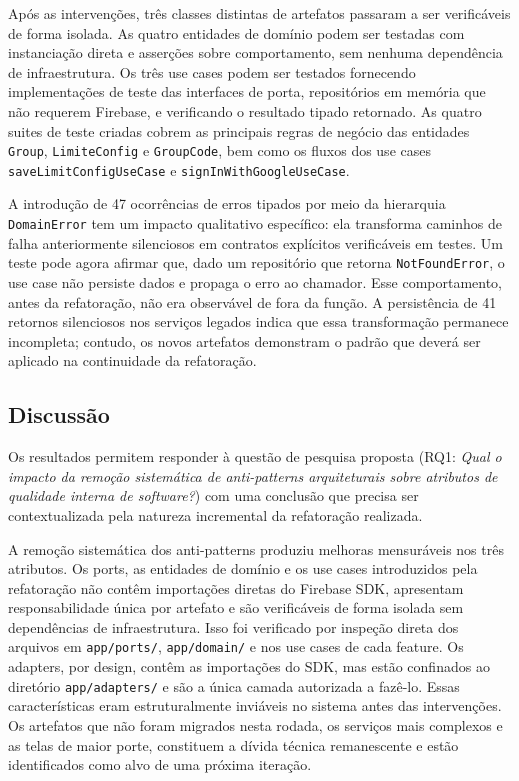 \documentclass[sigconf,anonymous]{acmart}
\begin{document}
Após as intervenções, três classes distintas de artefatos passaram a ser verificáveis de forma isolada. As quatro entidades de domínio podem ser testadas com instanciação direta e asserções sobre comportamento, sem nenhuma dependência de infraestrutura. Os três use cases podem ser testados fornecendo implementações de teste das interfaces de porta, repositórios em memória que não requerem Firebase, e verificando o resultado tipado retornado. As quatro suites de teste criadas cobrem as principais regras de negócio das entidades \texttt{Group}, \texttt{LimiteConfig} e \texttt{GroupCode}, bem como os fluxos dos use cases \texttt{saveLimitConfigUseCase} e \texttt{signInWithGoogleUseCase}.

A introdução de 47 ocorrências de erros tipados por meio da hierarquia \texttt{DomainError} tem um impacto qualitativo específico: ela transforma caminhos de falha anteriormente silenciosos em contratos explícitos verificáveis em testes. Um teste pode agora afirmar que, dado um repositório que retorna \texttt{NotFoundError}, o use case não persiste dados e propaga o erro ao chamador. Esse comportamento, antes da refatoração, não era observável de fora da função. A persistência de 41 retornos silenciosos nos serviços legados indica que essa transformação permanece incompleta; contudo, os novos artefatos demonstram o padrão que deverá ser aplicado na continuidade da refatoração.

\subsection{Discussão}

Os resultados permitem responder à questão de pesquisa proposta (RQ1: \textit{Qual o impacto da remoção sistemática de anti-patterns arquiteturais sobre atributos de qualidade interna de software?}) com uma conclusão que precisa ser contextualizada pela natureza incremental da refatoração realizada.

A remoção sistemática dos anti-patterns produziu melhoras mensuráveis nos três atributos. Os ports, as entidades de domínio e os use cases introduzidos pela refatoração não contêm importações diretas do Firebase SDK, apresentam responsabilidade única por artefato e são verificáveis de forma isolada sem dependências de infraestrutura. Isso foi verificado por inspeção direta dos arquivos em \texttt{app/ports/}, \texttt{app/domain/} e nos use cases de cada feature. Os adapters, por design, contêm as importações do SDK, mas estão confinados ao diretório \texttt{app/adapters/} e são a única camada autorizada a fazê-lo. Essas características eram estruturalmente inviáveis no sistema antes das intervenções. Os artefatos que não foram migrados nesta rodada, os serviços mais complexos e as telas de maior porte, constituem a dívida técnica remanescente e estão identificados como alvo de uma próxima iteração.
\end{document}
